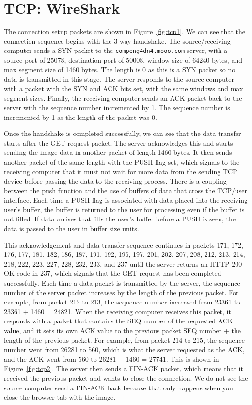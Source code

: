 \section*{TCP: WireShark}
The connection setup packets are shown in Figure~\ref{fig:tcp1}. We can see that the connection sequence begins with the 3-way handshake. The source/receiving computer sends a SYN packet to the \texttt{compeng4dn4.mooo.com} server, with a source port of 25078, destination port of 50008, window size of 64240 bytes, and max segment size of 1460 bytes. The length is 0 as this is a SYN packet so no data is transmitted in this stage. The server responds to the source computer with a packet with the SYN and ACK bits set, with the same windows and max segment sizes. Finally, the receiving computer sends an ACK packet back to the server with the sequence number incremented by 1. The sequence number is incremented by 1 as the length of the packet was 0.

Once the handshake is completed successfully, we can see that the data transfer starts after the GET request packet. The server acknowledges this and starts sending the image data in another packet of length 1460 bytes. It then sends another packet of the same length with the PUSH flag set, which signals to the receiving computer that it must not wait for more data from the sending TCP device before passing the data to the receiving process. There is a coupling between the push function and the use of buffers of data that cross the TCP/user interface. Each time a PUSH flag is associated with data placed into the receiving user's buffer, the buffer is returned to the user for processing even if the buffer is not filled. If data arrives that fills the user's buffer before a PUSH is seen, the data is passed to the user in buffer size units.

This acknowledgement and data transfer sequence continues in packets 171, 172, 176, 177, 181, 182, 186, 187, 191, 192, 196, 197, 201, 202, 207, 208, 212, 213, 214, 218, 222, 223, 227, 228, 232, 233, and 237 until the server returns an HTTP 200 OK code in 237, which signals that the GET request has been completed successfully. Each time a data packet is transmitted by the server, the sequence number of the server packet increases by the length of the previous packet. For example, from packet 212 to 213, the sequence number increased from 23361 to 23361 + 1460 = 24821. When the receiving computer receives this packet, it responds with a packet that contains the SEQ number of the requested ACK value, and it sets its own ACK value to the previous packet SEQ number + the length of the previous packet. For example, from packet 214 to 215, the sequence number went from 26281 to 560, which is what the server requested as the ACK, and the ACK went from 560 to 26281 + 1460 = 27741. This is shown in Figure~\ref{fig:tcp2}. The server then sends a FIN-ACK packet, which means that it received the previous packet and wants to close the connection. We do not see the source computer send a FIN-ACK back because that only happens when you close the browser tab with the image.

